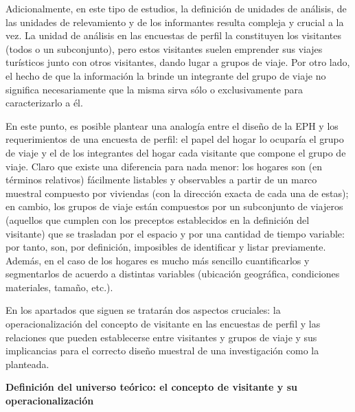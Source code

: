 \documentclass[
]{book}
\begin{document}
Adicionalmente, en este tipo de estudios, la definición de unidades de análisis, de las unidades de relevamiento y de los informantes resulta compleja y crucial a la vez. La unidad de análisis en las encuestas de perfil la constituyen los visitantes (todos o un subconjunto), pero estos visitantes suelen emprender sus viajes turísticos junto con otros visitantes, dando lugar a grupos de viaje. Por otro lado, el hecho de que la información la brinde un integrante del grupo de viaje no significa necesariamente que la misma sirva sólo o exclusivamente para caracterizarlo a él.

En este punto, es posible plantear una analogía entre el diseño de la EPH y los requerimientos de una encuesta de perfil: el papel del hogar lo ocuparía el grupo de viaje y el de los integrantes del hogar cada visitante que compone el grupo de viaje. Claro que existe una diferencia para nada menor: los hogares son (en términos relativos) fácilmente listables y observables a partir de un marco muestral compuesto por viviendas (con la dirección exacta de cada una de estas); en cambio, los grupos de viaje están compuestos por un subconjunto de viajeros (aquellos que cumplen con los preceptos establecidos en la definición del visitante) que se trasladan por el espacio y por una cantidad de tiempo variable: por tanto, son, por definición, imposibles de identificar y listar previamente. Además, en el caso de los hogares es mucho más sencillo cuantificarlos y segmentarlos de acuerdo a distintas variables (ubicación geográfica, condiciones materiales, tamaño, etc.).

En los apartados que siguen se tratarán dos aspectos cruciales: la operacionalización del concepto de visitante en las encuestas de perfil y las relaciones que pueden establecerse entre visitantes y grupos de viaje y sus implicancias para el correcto diseño muestral de una investigación como la planteada.

\hfill\break
\textbf{Definición del universo teórico: el concepto de visitante y su operacionalización}
\end{document}
